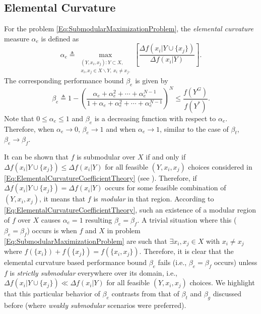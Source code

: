 \documentclass[conference]{IEEEtran}
\begin{document}
\subsection{Elemental Curvature \cite{Wang2016}}\label{SubSec:ElementalCurvature}

For the problem \eqref{Eq:SubmodularMaximizationProblem}, the \emph{elemental curvature} measure $\alpha_e$ is defined as 
\begin{equation}\label{Eq:ElementalCurvatureCoefficientTheory}
    \alpha_e \triangleq \max_{\substack{(Y,x_i,x_j): Y \subset X,\\ x_i,x_j \in X \backslash Y,\ x_i \neq x_j.}}\left[\frac{\Delta f(x_i \vert Y \cup \{x_j\})}{\Delta f(x_i \vert Y)}\right].
\end{equation}
The corresponding performance bound $\beta_e$ is given by 
\begin{equation}\label{Eq:ElementalCurvatureBoundTheory}
    \beta_e \triangleq 1-\left(\frac{\alpha_e + \alpha_e^2 + \cdots + \alpha_e^{N-1}}{1 + \alpha_e + \alpha_e^2 + \cdots + \alpha_e^{N-1}}\right)^N \leq \frac{f(Y^G)}{f(Y^*)}.
\end{equation}
Note that $0 \leq \alpha_e \leq 1$ and $\beta_e$ is a decreasing function with respect to $\alpha_e$. Therefore, when $\alpha_e \rightarrow 0$, $\beta_e \rightarrow 1$ and when $\alpha_e \rightarrow 1$, similar to the case of $\beta_t$, $\beta_e \rightarrow \beta_f$.



It can be shown that $f$ is submodular over $X$ if and only if $\Delta f(x_i \vert Y \cup  \{x_j\}) \leq \Delta f(x_i \vert Y)$ for all feasible $(Y,x_i,x_j)$ choices considered in \eqref{Eq:ElementalCurvatureCoefficientTheory} (see \cite[Prop. 2.1]{Nemhauser1978}). 
Therefore, if $\Delta f(x_i \vert Y \cup  \{x_j\}) = \Delta f(x_i \vert Y)$ occurs for some feasible combination of $(Y,x_i,x_j)$, it means that $f$ is \emph{modular} in that region. According to \eqref{Eq:ElementalCurvatureCoefficientTheory}, such an existence of a modular region of $f$ over $X$ causes $\alpha_e = 1$ resulting $\beta_e = \beta_f$. A trivial situation where this ($\beta_e = \beta_f$) occurs is when $f$ and $X$ in problem \eqref{Eq:SubmodularMaximizationProblem} are such that $\exists x_i,x_j \in X$ with $x_i \neq x_j$ where $f(\{x_i\}) + f(\{x_j\}) = f(\{x_i,x_j\})$. Therefore, it is clear that the elemental curvature based performance bound $\beta_e$ fails (i.e., $\beta_e = \beta_f$ occurs) unless $f$ is \emph{strictly submodular} everywhere over its domain, i.e., $\Delta f(x_i \vert Y \cup  \{x_j\}) \ll \Delta f(x_i \vert Y)$ for all feasible $(Y,x_i,x_j)$ choices. We highlight that this particular behavior of $\beta_e$ contrasts from that of $\beta_t$ and $\beta_g$ discussed before (where \emph{weakly submodular} scenarios were preferred). 
\end{document}
